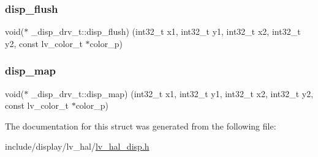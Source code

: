 \mbox{\label{struct__disp__drv__t_a43808fdd9452b66575b20a705af76559}} 
\subsubsection{\texorpdfstring{disp\_flush}{disp\_flush}}
{\footnotesize\ttfamily void($\ast$ \+\_\+disp\+\_\+drv\+\_\+t\+::disp\+\_\+flush) (int32\+\_\+t x1, int32\+\_\+t y1, int32\+\_\+t x2, int32\+\_\+t y2, const lv\+\_\+color\+\_\+t $\ast$color\+\_\+p)}

\mbox{\label{struct__disp__drv__t_afea4a862de28c974e153c31715efec63}} 
\subsubsection{\texorpdfstring{disp\_map}{disp\_map}}
{\footnotesize\ttfamily void($\ast$ \+\_\+disp\+\_\+drv\+\_\+t\+::disp\+\_\+map) (int32\+\_\+t x1, int32\+\_\+t y1, int32\+\_\+t x2, int32\+\_\+t y2, const lv\+\_\+color\+\_\+t $\ast$color\+\_\+p)}



The documentation for this struct was generated from the following file\+:\begin{DoxyCompactItemize}
\item 
include/display/lv\+\_\+hal/\mbox{\hyperlink{lv__hal__disp_8h}{lv\+\_\+hal\+\_\+disp.\+h}}\end{DoxyCompactItemize}
